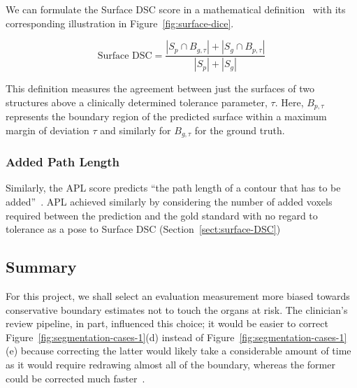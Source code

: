 \documentclass[12pt,twoside]{report}
\begin{document}
We can formulate the Surface DSC score in a mathematical definition~\cite{Sherer2021-le} with its corresponding illustration in Figure~\ref{fig:surface-dice}.

\begin{equation*}
 \text{Surface DSC} = \frac{|S_p \cap B_{g,\tau}| + |S_g \cap B_{p,\tau}|}{|S_p| + |S_g|}
\end{equation*}

This definition measures the agreement between just the surfaces of two structures above a clinically determined tolerance parameter, $\tau$. Here, $B_{p,\tau}$ represents the boundary region of the predicted surface within a maximum margin of deviation $\tau$ and similarly for $B_{g,\tau}$ for the ground truth.

\subsubsection{Added Path Length}

Similarly, the APL score predicts ``the path length of a contour that has to be added''~\cite{APL}. APL achieved similarly by considering the number of added voxels required between the prediction and the gold standard with no regard to tolerance as a pose to Surface DSC (Section~\ref{sect:surface-DSC})



\subsection{Summary}


For this project, we shall select an evaluation measurement more biased towards conservative boundary estimates not to touch the organs at risk. The clinician's review pipeline, in part, influenced this choice; it would be easier to correct Figure~\ref{fig:segmentation-cases-1}(d) instead of Figure~\ref{fig:segmentation-cases-1}(e) because correcting the latter would likely take a considerable amount of time as it would require redrawing almost all of the boundary, whereas the former could be corrected much faster~\cite{Nikolov2021-xe}.
\end{document}
